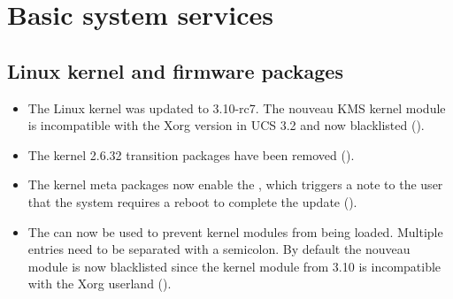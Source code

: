 

\section{Basic system services}


\subsection{Linux kernel and firmware packages}
\begin{itemize}
\item The Linux kernel was updated to 3.10-rc7. The nouveau KMS kernel
  module is incompatible with the Xorg version in UCS 3.2 and now
  blacklisted ().

\item The kernel 2.6.32 transition packages have been removed ().

\item The kernel meta packages now enable the
  , which triggers a note to the user
  that the system requires a reboot to complete the update ().

\item The  can now be used to prevent kernel
  modules from being loaded. Multiple entries need to be separated
  with a semicolon. By default the nouveau module is now blacklisted
  since the kernel module from 3.10 is incompatible with the Xorg
  userland ().

\end{itemize}

